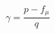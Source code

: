 \documentclass[12pt]{article}
\begin{document}
\begin{displaymath}
\gamma = \frac{p-f_\mu}{q}
\end{displaymath}
\end{document}
